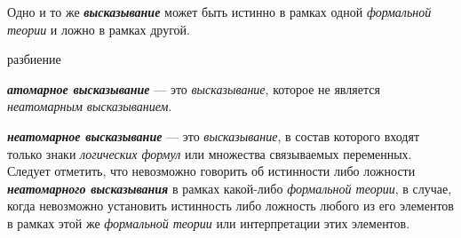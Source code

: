 Одно и то же \textbf{\textit{высказывание}} может быть истинно в рамках одной \textit{формальной теории} и ложно в рамках другой.



\begin{SCn}
\begin{scnrelfromset}{разбиение}
\end{scnrelfromset}
\end{SCn}

\textbf{\textit{атомарное высказывание}} --- это \textit{высказывание}, которое не является \textit{неатомарным высказыванием}.

\textbf{\textit{неатомарное высказывание}} --- это \textit{высказывание}, в состав которого входят только знаки \textit{логических формул} или множества связываемых переменных. Следует отметить, что невозможно говорить об истинности либо ложности \textbf{\textit{неатомарного высказывания}} в рамках какой-либо \textit{формальной теории}, в случае, когда невозможно установить истинность либо ложность любого из его элементов в рамках этой же \textit{формальной теории} или интерпретации этих элементов.


